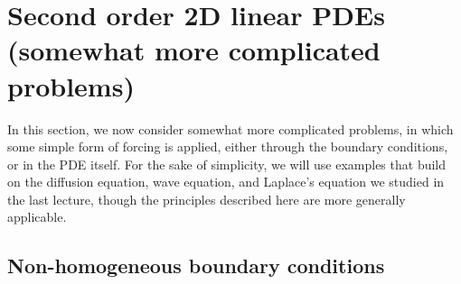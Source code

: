 \section{Second order 2D linear PDEs (somewhat more complicated problems)}

In this section, we now consider somewhat more complicated problems, in which some simple form of forcing is applied, either through the boundary conditions, or in the PDE itself. For the sake of simplicity, we will use examples that build on the diffusion equation, wave equation, and Laplace's equation we studied in the last lecture, though the principles described here are more generally applicable.  

\subsection{Non-homogeneous boundary conditions}

